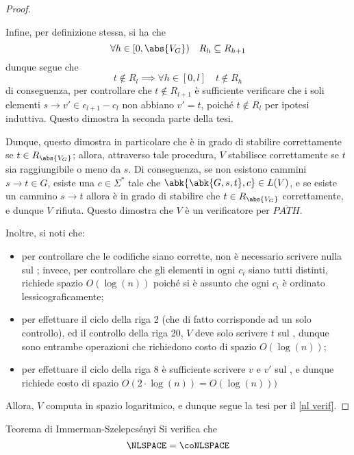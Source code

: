 \documentclass[a4paper, 12pt]{report}
\begin{document}
\begin{proof}
\begin{enumerate}[label=]
                    Infine, per definizione stessa, si ha che $$\forall h \in [0, \abs{V_G}) \quad R_h \subseteq R_{h + 1}$$ dunque segue che $$t \notin R_l \implies \forall h \in [0, l] \quad t \notin R_h$$ di conseguenza, per controllare che $t \notin R_{l + 1}$ è sufficiente verificare che i soli elementi $s \to v' \in c_{l + 1} - c_l$ non abbiano $v' = t$, poiché $t \notin R_l$ per ipotesi induttiva. Questo dimostra la seconda parte della tesi.
            \end{enumerate}

            Dunque, questo dimostra in particolare che  è in grado di stabilire correttamente se $t \in R_{\abs{V_G}}$; allora, attraverso tale procedura, $V$ stabilisce correttamente se $t$ sia raggiungibile o meno da $s$. Di conseguenza, se non esistono cammini $s \to t \in G$, esiste una $c \in \Sigma ^*$ tale che $\abk{\abk{G, s, t}, c} \in L(V)$, e se esiste un cammino $s \to t$ allora  è in grado di stabilire che $t \in R_{\abs{V_G}}$ correttamente, e dunque $V$ rifiuta. Questo dimostra che $V$ è un verificatore per $\overline{PATH}$.

            Inoltre, si noti che:

            \begin{itemize}
                \item per controllare che le codifiche siano corrette, non è necessario scrivere nulla sul ; invece, per controllare che gli elementi in ogni $c_i$ siano tutti distinti, richiede spazio $O(\log(n))$ poiché si è assunto che ogni $c_i$ è ordinato lessicograficamente;
                \item per effettuare il ciclo della riga 2 (che di fatto corrisponde ad un solo controllo), ed il controllo della riga 20, $V$ deve solo scrivere $t$ sul , dunque sono entrambe operazioni che richiedono costo di spazio $O(\log(n))$;
                \item per effettuare il ciclo della riga 8 è sufficiente scrivere $v$ e $v'$ sul , e dunque richiede costo di spazio $O(2 \cdot \log(n)) = O(\log(n)))$
            \end{itemize}

            Allora, $V$ computa in spazio logaritmico, e dunque segue la tesi per il \cref{nl verif}.
    \end{proof}

    \begin{framedthm}{Teorema di Immerman-Szelepcsényi}
        Si verifica che $$\NLSPACE = \coNLSPACE$$
    \end{framedthm}
\end{document}
